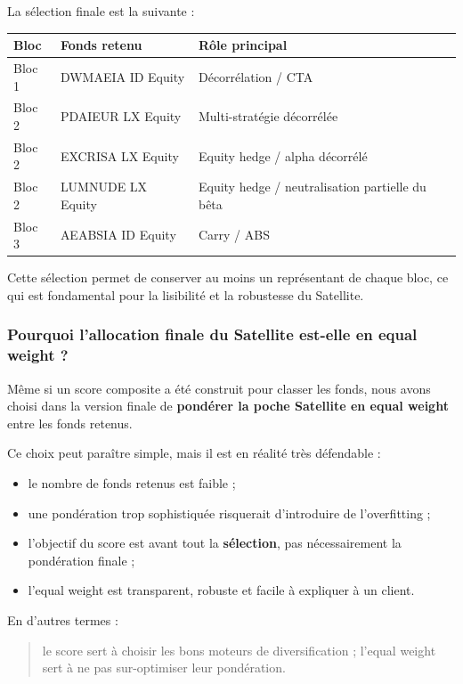 \documentclass{article}
\begin{document}
La sélection finale est la suivante :
\begin{center}
\begin{tabular}{lll}
\hline
\textbf{Bloc} & \textbf{Fonds retenu} & \textbf{Rôle principal} \\
\hline
Bloc 1 & DWMAEIA ID Equity & Décorrélation / CTA \\
Bloc 2 & PDAIEUR LX Equity & Multi-stratégie décorrélée \\
Bloc 2 & EXCRISA LX Equity & Equity hedge / alpha décorrélé \\
Bloc 2 & LUMNUDE LX Equity & Equity hedge / neutralisation partielle du bêta \\
Bloc 3 & AEABSIA ID Equity & Carry / ABS \\
\hline
\end{tabular}
\end{center}

Cette sélection permet de conserver au moins un représentant de chaque bloc, ce qui est fondamental pour la lisibilité et la robustesse du Satellite.

\subsubsection{Pourquoi l’allocation finale du Satellite est-elle en equal weight ?}

Même si un score composite a été construit pour classer les fonds, nous avons choisi dans la version finale de \textbf{pondérer la poche Satellite en equal weight} entre les fonds retenus.

Ce choix peut paraître simple, mais il est en réalité très défendable :
\begin{itemize}
    \item le nombre de fonds retenus est faible ;
    \item une pondération trop sophistiquée risquerait d’introduire de l’overfitting ;
    \item l’objectif du score est avant tout la \textbf{sélection}, pas nécessairement la pondération finale ;
    \item l’equal weight est transparent, robuste et facile à expliquer à un client.
\end{itemize}

En d’autres termes :
\begin{quote}
le score sert à choisir les bons moteurs de diversification ; l’equal weight sert à ne pas sur-optimiser leur pondération.
\end{quote}
\end{document}
